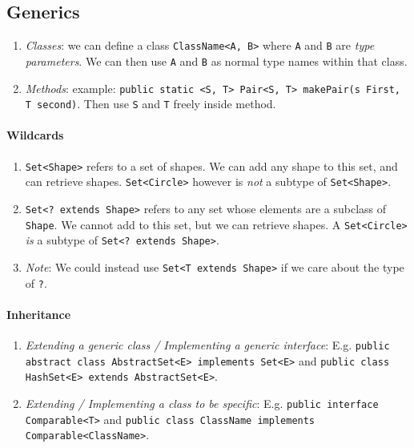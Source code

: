 \documentclass[twocolumn,english]{article}
\begin{document}
\subsection{Generics}
\begin{enumerate}
\item \emph{Classes}: we can define a class \texttt{ClassName\textless{}A,
B\textgreater{}} where \texttt{A} and \texttt{B} are \emph{type parameters}.
We can then use \texttt{A} and \texttt{B} as normal type names within
that class.
\item \emph{Methods}: example: \texttt{public static \textless{}S, T\textgreater{} Pair\textless{}S, T\textgreater{} makePair(s First, T second)}. Then
use \texttt{S} and \texttt{T} freely inside method.
\end{enumerate}

\paragraph{Wildcards}
\begin{enumerate}
\item \texttt{Set\textless{}Shape\textgreater{}} refers to a set of shapes.
We can add any shape to this set, and can retrieve shapes. \texttt{Set\textless{}Circle\textgreater{}}
however is \emph{not} a subtype of \texttt{Set\textless{}Shape\textgreater{}}.
\item \texttt{Set\textless{}? extends Shape\textgreater{}} refers to any
set whose elements are a subclass of \texttt{Shape}. We cannot add
to this set, but we can retrieve shapes. A \texttt{Set\textless{}Circle\textgreater{}}
\emph{is} a subtype of \texttt{Set\textless{}? extends Shape\textgreater{}}.
\item \emph{Note}: We could instead use \texttt{Set\textless{}T extends
Shape\textgreater{}} if we care about the type of \texttt{?}.
\end{enumerate}

\paragraph{Inheritance}
\begin{enumerate}
\item \emph{Extending a generic class / Implementing a generic interface}:
E.g. \texttt{public abstract class AbstractSet\textless{}E\textgreater{}
implements Set\textless{}E\textgreater{}} and \texttt{public class
HashSet\textless{}E\textgreater{} extends AbstractSet\textless{}E\textgreater{}}.
\item \emph{Extending / Implementing a class to be specific}: E.g. \texttt{public
interface Comparable\textless{}T\textgreater{}} and \texttt{public
class ClassName implements Comparable\textless{}ClassName\textgreater{}}.
\end{enumerate}
\end{document}
